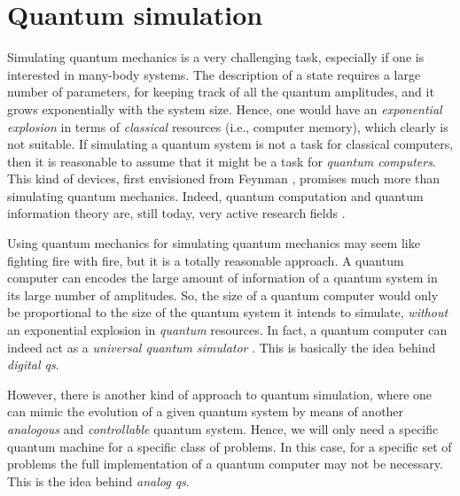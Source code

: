 \section{Quantum simulation}
\label{sec:quantum_simulation}

Simulating quantum mechanics is a very challenging task, especially if one is interested in many-body systems.
The description of a state requires a large number of parameters, for keeping track of all the quantum amplitudes, and it grows exponentially with the system size.
Hence, one would have an \emph{exponential explosion} in terms of \emph{classical} resources (i.e., computer memory), which clearly is not suitable.
If simulating a quantum system is not a task for classical computers, then it is reasonable to assume that it might be a task for \emph{quantum computers}.
This kind of devices, first envisioned from Feynman \cite{feynman2018simulating}, promises much more than simulating quantum mechanics.
Indeed, quantum computation and quantum information theory are, still today, very active research fields \citneeded.

Using quantum mechanics for simulating quantum mechanics may seem like fighting fire with fire, but it is a totally reasonable approach.
A quantum computer can encodes the large amount of information of a quantum system in its large number of amplitudes.
So, the size of a quantum computer would only be proportional to the size of the quantum system it intends to simulate, \emph{without} an exponential explosion in \emph{quantum} resources.
In fact, a quantum computer can indeed act as a \emph{universal quantum simulator} \cite{lloyd1996simulator}.
This is basically the idea behind \emph{digital \acl{qs}}.

However, there is another kind of approach to quantum simulation, where one can mimic the evolution of a given quantum system by means of another \emph{analogous} and \emph{controllable} quantum system.
Hence, we will only need a specific quantum machine for a specific class of problems.
In this case, for a specific set of problems the full implementation of a quantum computer may not be necessary.
This is the idea behind \emph{analog \acl{qs}}.

